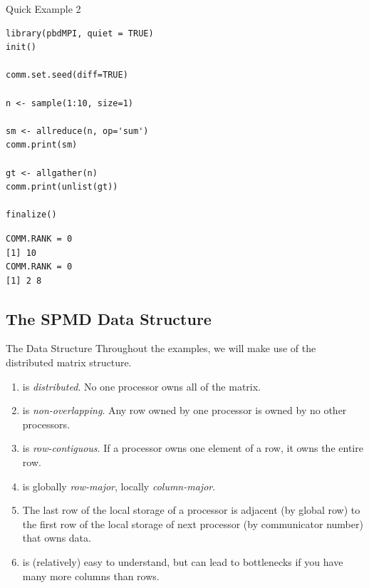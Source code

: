 \begin{frame}
  \begin{exampleblock}{Quick Example 2}
   \begin{center}
\begin{lstlisting}
library(pbdMPI, quiet = TRUE)
init()

comm.set.seed(diff=TRUE)

n <- sample(1:10, size=1)

sm <- allreduce(n, op='sum')
comm.print(sm)

gt <- allgather(n)
comm.print(unlist(gt))

finalize()
\end{lstlisting}

\begin{lstlisting}[title=Sample Output]
COMM.RANK = 0
[1] 10
COMM.RANK = 0
[1] 2 8
\end{lstlisting}
    \end{center}
  \end{exampleblock}
\end{frame}





\subsection{The SPMD Data Structure}

\begin{frame}
  \begin{block}{The  Data Structure}\pause
  Throughout the examples, we will make use of the  distributed matrix structure.
  \begin{enumerate}
    \item {} is \emph{distributed}.  No one processor owns all of the matrix.
    \item {} is \emph{non-overlapping}. Any row owned by one processor is owned by no other processors.
    \item {} is \emph{row-contiguous}.  If a processor owns one element of a row, it owns the entire row.
    \item {} is globally \emph{row-major}, locally \emph{column-major}.
    \item The last row of the local storage of a processor is adjacent (by global row) to the first row of the local storage of next processor (by communicator number) that owns data.
    \item {} is (relatively) easy to understand, but can lead to bottlenecks if you have many more columns than rows.
  \end{enumerate}
  \end{block}
\end{frame}

